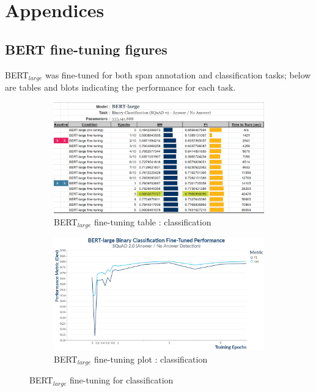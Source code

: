 \appendix

\section{Appendices}
\label{sec:appendix}
\small

\subsection{BERT fine-tuning figures}
\label{apdx:BERT_fine_tuning_span_annotation_sec}

BERT$_{large}$ was fine-tuned for both span annotation and classification tasks; below are tables and blots indicating the performance for each task.

\begin{figure}[h]
	\centering
	\begin{subfigure}{0.95\textwidth}%
		\centering
		\includegraphics[width=\linewidth]{images/classification/BERT_Large_Training.png}%
		\caption{BERT$_{large}$ fine-tuning table : classification}
	\end{subfigure}%

	\vspace*{8pt}%
	
	\begin{subfigure}{0.96\textwidth}%
		\centering
		\includegraphics[width=\linewidth]{images/BinaryClassification_BERT_Training_Performance_plot.png}%
		\caption{BERT$_{large}$ fine-tuning plot : classification}
	\end{subfigure}%
	\caption{\label{apdx:BERT_fine_tuning_classification}BERT$_{large}$ fine-tuning for classification}
\end{figure}%

